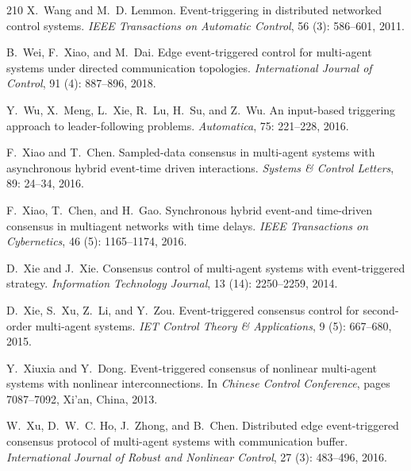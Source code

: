 \documentclass{autart}
\begin{document}
{\begin{thebibliography}{210}
X.~Wang and M.~D. Lemmon.
\newblock Event-triggering in distributed networked control systems.
\newblock \emph{IEEE Transactions on Automatic Control}, 56
  (3): 586--601, 2011.

B.~Wei, F.~Xiao, and M.~Dai.
\newblock Edge event-triggered control for multi-agent systems under directed
  communication topologies.
\newblock \emph{International Journal of Control}, 91 (4):
  887--896, 2018.

Y.~Wu, X.~Meng, L.~Xie, R.~Lu, H.~Su, and Z.~Wu.
\newblock An input-based triggering approach to leader-following problems.
\newblock \emph{Automatica}, 75: 221--228, 2016.

F.~Xiao and T.~Chen.
\newblock Sampled-data consensus in multi-agent systems with asynchronous
  hybrid event-time driven interactions.
\newblock \emph{Systems \& Control Letters}, 89: 24--34, 2016.

F.~Xiao, T.~Chen, and H.~Gao.
\newblock Synchronous hybrid event-and time-driven consensus in multiagent
  networks with time delays.
\newblock \emph{IEEE Transactions on Cybernetics}, 46 (5):
  1165--1174, 2016.

D.~Xie and J.~Xie.
\newblock Consensus control of multi-agent systems with event-triggered
  strategy.
\newblock \emph{Information Technology Journal}, 13 (14):
  2250--2259, 2014.

D.~Xie, S.~Xu, Z.~Li, and Y.~Zou.
\newblock Event-triggered consensus control for second-order multi-agent
  systems.
\newblock \emph{IET Control Theory \& Applications}, 9 (5):
  667--680, 2015.

Y.~Xiuxia and Y.~Dong.
\newblock Event-triggered consensus of nonlinear multi-agent systems with
  nonlinear interconnections.
\newblock In \emph{Chinese Control Conference}, pages 7087--7092, Xi'an, China,
  2013.

W.~Xu, D.~W.~C. Ho, J.~Zhong, and B.~Chen.
\newblock Distributed edge event-triggered consensus protocol of multi-agent
  systems with communication buffer.
\newblock \emph{International Journal of Robust and Nonlinear Control},
  27 (3): 483--496, 2016.


\end{thebibliography}}
\end{document}
